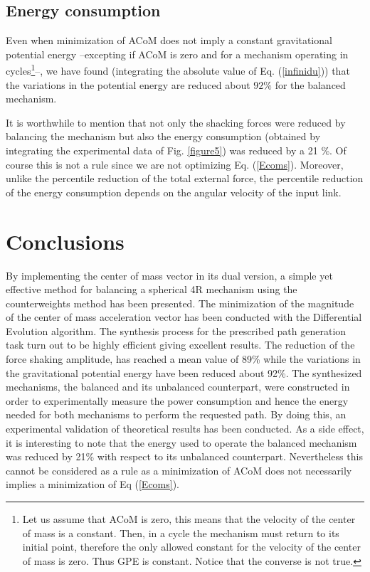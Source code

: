 \documentclass[11pt]{article}
\begin{document}
\subsection*{Energy consumption}
Even when minimization of ACoM does not imply a constant gravitational 
potential energy --excepting if ACoM is zero and 
for a mechanism operating in cycles\footnote{Let us assume that ACoM is 
zero, this means that the velocity of the center of mass is a constant. 
Then, in a cycle the mechanism must return to its initial point, 
therefore the only  allowed constant for the velocity of the center of 
mass is zero. Thus GPE is constant. Notice that the converse is not 
true. }--, we have found (integrating the absolute value of 
Eq. (\ref{infinidu})) that the variations in the potential energy are 
reduced about $92\%$ for the balanced mechanism.

It is worthwhile to mention that not only the shacking forces were 
reduced by balancing the mechanism but also the energy consumption 
(obtained by integrating the experimental data of Fig. \ref{figure5}) 
was reduced by a 21 \%. Of course this is not a rule since we are not 
optimizing Eq. (\ref{Ecoms}). Moreover, unlike the percentile reduction 
of the total external force, the percentile reduction of the energy 
consumption depends on the angular velocity of the input link. 


\section{Conclusions}\label{conclu}
By implementing the center of mass vector in its dual version, a simple 
yet effective method for balancing a spherical 4R mechanism 
using the counterweights method has been presented. The minimization of 
the magnitude of the center of mass acceleration vector has been 
conducted with the Differential Evolution algorithm.  The synthesis 
process for the prescribed path generation task turn out to be highly 
efficient giving excellent results. The reduction of the force shaking 
amplitude, has reached a mean value of 89\% while the variations in the 
gravitational potential energy have been reduced about 92\%. The 
synthesized mechanisms, the balanced and its unbalanced 
counterpart, were constructed in order to experimentally measure the 
power consumption and hence the energy needed for both mechanisms to 
perform the requested path. By doing this, an experimental validation of 
theoretical results has been conducted. As a side effect, it is 
interesting to note that the energy used to operate the  balanced 
mechanism was reduced by 21\% with respect to its unbalanced 
counterpart. Nevertheless this cannot be considered as a rule as a 
minimization of ACoM does not necessarily implies a minimization of 
Eq (\ref{Ecoms}).
\end{document}
